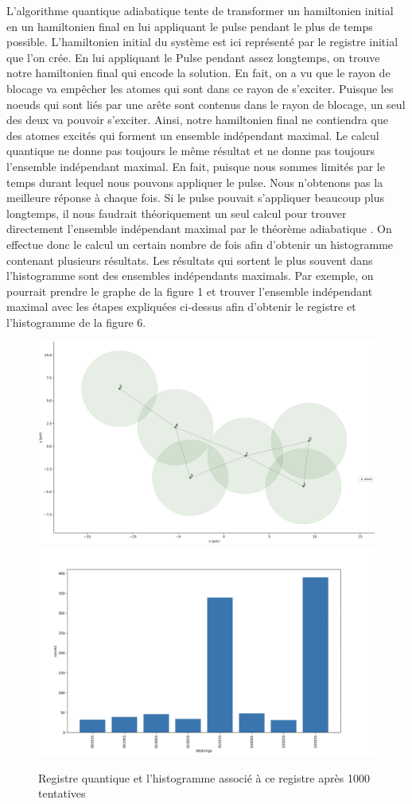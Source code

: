 \documentclass[11pt]{article}
\begin{document}
L'algorithme quantique adiabatique tente de transformer un hamiltonien initial en un hamiltonien final en lui appliquant le pulse pendant le plus de temps possible. L'hamiltonien initial du système est ici représenté par le registre initial que l'on crée. En lui appliquant le Pulse pendant assez longtemps, on trouve notre hamiltonien final qui encode la solution. En fait, on a vu que le rayon de blocage va empêcher les atomes qui sont dans ce rayon de s'exciter. Puisque les noeuds qui sont liés par une arête sont contenus dans le rayon de blocage, un seul des deux va pouvoir s'exciter. Ainsi, notre hamiltonien final ne contiendra que des atomes excités qui forment un ensemble indépendant maximal. Le calcul quantique ne donne pas toujours le même résultat et ne donne pas toujours l'ensemble indépendant maximal. En fait, puisque nous sommes limités par le temps durant lequel nous pouvons appliquer le pulse. Nous n'obtenons pas la meilleure réponse à chaque fois. Si le pulse pouvait s'appliquer beaucoup plus longtemps, il nous faudrait théoriquement un seul calcul pour trouver directement l'ensemble indépendant maximal par le théorème adiabatique \cite{amin_consistency_2009}. On effectue donc le calcul un certain nombre de fois afin d'obtenir un histogramme contenant plusieurs résultats. Les résultats qui sortent le plus souvent dans l'histogramme sont des ensembles indépendants maximals. Par exemple, on pourrait prendre le graphe de la figure 1 et trouver l'ensemble indépendant maximal avec les étapes expliquées ci-dessus afin d'obtenir le registre et l'histogramme de la figure 6.
\begin{figure}[H]
    \centering
    \includegraphics[width = 0.48\linewidth]{images/registre_exemple.png}
    \includegraphics[width=0.49\linewidth]{images/histogram_exemple.png}
    \caption{Registre quantique et l'histogramme associé à ce registre après 1000 tentatives}
    \label{QMIS_exemple}
\end{figure}
    
\end{document}

